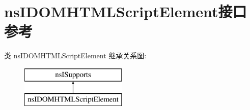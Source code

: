 \hypertarget{interfacens_i_d_o_m_h_t_m_l_script_element}{}\section{ns\+I\+D\+O\+M\+H\+T\+M\+L\+Script\+Element接口 参考}
\label{interfacens_i_d_o_m_h_t_m_l_script_element}
类 ns\+I\+D\+O\+M\+H\+T\+M\+L\+Script\+Element 继承关系图\+:\begin{figure}[H]
\begin{center}
\leavevmode
\includegraphics[height=2.000000cm]{interfacens_i_d_o_m_h_t_m_l_script_element}
\end{center}
\end{figure}
